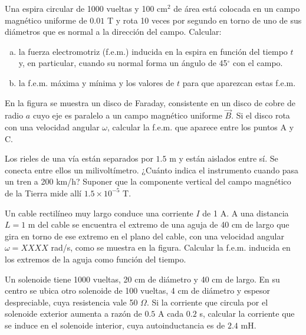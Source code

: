 \documentclass[problemas]{guia}
\begin{document}
 
\maketitle

\begin{problema}{}
    Una espira circular de 1000 vueltas y 100 cm$^2$ de área está colocada en 
    un campo magnético uniforme de $0.01$ T y rota 10 veces por segundo en 
    torno de uno de sus diámetros que es normal a la dirección del campo. 
    Calcular:
    \begin{enumerate}[(a)]
        \item la fuerza electromotriz (f.e.m.) inducida en la espira en función 
            del tiempo $t$ y, en particular, cuando su normal forma un ángulo 
            de 45$^\circ$ con el campo.
        \item la f.e.m. máxima y mínima y los valores de $t$ para que aparezcan
            estas f.e.m.
    \end{enumerate}
\end{problema} 

\begin{problema}{}
    En la figura se muestra un disco de Faraday, consistente en un disco de 
    cobre de radio $a$ cuyo eje es paralelo a un campo magnético uniforme 
    $\vec{B}$. Si  el  disco  rota  con  una  velocidad  angular  $\omega$,  
    calcular  la  f.e.m.  que aparece entre los puntos A y C.
\end{problema} 

\begin{problema}{}
    Los rieles de una vía están separados por $1.5$ m y están aislados entre 
    sí. Se conecta entre ellos un milivoltímetro. ¿Cuánto indica el instrumento
    cuando pasa un tren a 200 km/h? Suponer que la componente vertical del 
    campo magnético de la Tierra mide allí $1.5\times10^{-5}$ T.
\end{problema} 

\begin{problema}{}
    Un cable rectilíneo muy largo conduce una corriente $I$ de 1 A. A una 
    distancia $L = 1$ m del cable se encuentra el extremo de una aguja de 
    40 cm de largo que gira en torno de ese extremo en el plano del cable, con 
    una velocidad angular $\omega = XXXX$ rad/s, como se muestra en la figura. 
    Calcular la f.e.m. inducida en los extremos de la aguja como función del 
    tiempo.
\end{problema} 

\begin{problema}{}
    Un solenoide tiene 1000 vueltas, 20 cm de diámetro y 40 cm de largo. En su 
    centro se ubica otro solenoide de 100 vueltas, 4 cm de diámetro y espesor 
    despreciable, cuya resistencia vale 50 $\Omega$. Si la corriente que 
    circula por el solenoide exterior aumenta a razón de $0.5$ A cada $0.2$ s,
    calcular la corriente que se induce en el solenoide interior, cuya 
    autoinductancia es de $2.4$ mH.
\end{problema} 
\end{document}
